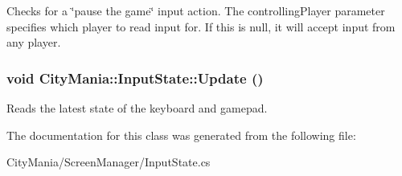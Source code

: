 Checks for a \char`\"{}pause the game\char`\"{} input action. The controllingPlayer parameter specifies which player to read input for. If this is null, it will accept input from any player. \hypertarget{classCityMania_1_1InputState_ae691099430d3501cb236c0a7b0d39179}{
\subsubsection[{Update}]{\setlength{\rightskip}{0pt plus 5cm}void CityMania::InputState::Update ()}}
\label{classCityMania_1_1InputState_ae691099430d3501cb236c0a7b0d39179}


Reads the latest state of the keyboard and gamepad. 

The documentation for this class was generated from the following file:\begin{DoxyCompactItemize}
\item 
CityMania/ScreenManager/InputState.cs\end{DoxyCompactItemize}
